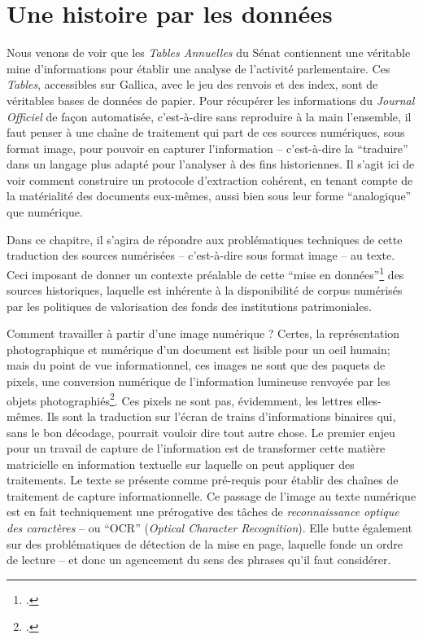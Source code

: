 \chapter{Une histoire par les données}

Nous venons de voir que les \emph{Tables Annuelles} du Sénat contiennent une véritable mine d'informations pour établir une analyse de l'activité parlementaire. Ces \emph{Tables}, accessibles sur Gallica, avec le jeu des renvois et des index, sont de véritables bases de données de papier. Pour récupérer les informations du \emph{Journal Officiel} de façon automatisée, c'est-à-dire sans reproduire à la main l'ensemble, il faut penser à une chaîne de traitement qui part de ces sources numériques, sous format image, pour pouvoir en capturer l'information -- c'est-à-dire la \enquote{traduire} dans un langage plus adapté pour l'analyser à des fins historiennes. Il s'agit ici de voir comment construire un protocole d’extraction cohérent, en tenant compte de la matérialité des documents eux-mêmes, aussi bien sous leur forme \enquote{analogique} que numérique. 

Dans ce chapitre, il s'agira de répondre aux problématiques techniques de cette traduction des sources numérisées -- c'est-à-dire sous format image -- au texte. Ceci imposant de donner un contexte préalable de cette \enquote{mise en données}\footcite[][]{clavert} des sources historiques, laquelle est inhérente à la disponibilité de corpus numérisés par les politiques de valorisation des fonds des institutions patrimoniales. 

Comment travailler à partir d'une image numérique ? Certes, la représentation photographique et numérique d'un document est lisible pour un oeil humain; mais du point de vue informationnel, ces images ne sont que des paquets de pixels, une conversion numérique de l'information lumineuse renvoyée par les objets photographiés\footcite[][]{claerr}. Ces pixels ne sont pas, évidemment, les lettres elles-mêmes. Ils sont la traduction sur l'écran de trains d'informations binaires qui, sans le bon décodage, pourrait vouloir dire tout autre chose. Le premier enjeu pour un travail de capture de l'information est de transformer cette matière matricielle en information textuelle sur laquelle on peut appliquer des traitements. Le texte se présente comme pré-requis pour établir des chaînes de traitement de capture informationnelle. Ce passage de l'image au texte numérique est en fait techniquement une prérogative des tâches de \emph{reconnaissance optique des caractères} -- ou \enquote{OCR} (\emph{Optical Character Recognition}). Elle butte également sur des problématiques de détection de la mise en page, laquelle fonde un ordre de lecture -- et donc un agencement du sens des phrases qu'il faut considérer. 

